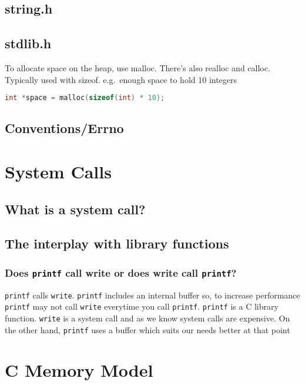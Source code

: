 \subsection{string.h}

\subsection{stdlib.h}

To allocate space on the heap, use malloc. There's also realloc and calloc. Typically used with sizeof. e.g.~enough space to hold 10 integers

\begin{lstlisting}[language=C]
int *space = malloc(sizeof(int) * 10);
\end{lstlisting}

\subsection{Conventions/Errno}

\section{System Calls}

\subsection{What is a system call?}

\subsection{The interplay with library functions}

\subsubsection{Does \texttt{printf} call write or does write call \texttt{printf}?}

\texttt{printf} calls \texttt{write}. \texttt{printf} includes an
internal buffer so, to increase performance \texttt{printf} may not call
\texttt{write} everytime you call \texttt{printf}. \texttt{printf} is a
C library function. \texttt{write} is a system call and as we know
system calls are expensive. On the other hand, \texttt{printf} uses a
buffer which suits our needs better at that point

\section{C Memory Model}

